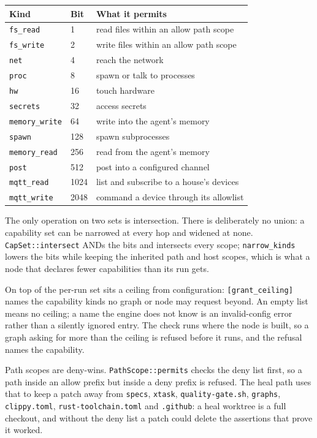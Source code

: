 \begin{longtable}{@{}p{}p{}p{}@{}}
\toprule
\textbf{Kind} & \textbf{Bit} & \textbf{What it permits} \\
\midrule
\endhead
\texttt{fs\_read} & 1 & read files within an allow path scope \\
\texttt{fs\_write} & 2 & write files within an allow path scope \\
\texttt{net} & 4 & reach the network \\
\texttt{proc} & 8 & spawn or talk to processes \\
\texttt{hw} & 16 & touch hardware \\
\texttt{secrets} & 32 & access secrets \\
\texttt{memory\_write} & 64 & write into the agent's memory \\
\texttt{spawn} & 128 & spawn subprocesses \\
\texttt{memory\_read} & 256 & read from the agent's memory \\
\texttt{post} & 512 & post into a configured channel \\
\texttt{mqtt\_read} & 1024 & list and subscribe to a house's devices \\
\texttt{mqtt\_write} & 2048 & command a device through its allowlist \\
\bottomrule
\end{longtable}

The only operation on two sets is intersection. There is deliberately no union: a capability
set can be narrowed at every hop and widened at none. \texttt{CapSet::intersect} ANDs the bits
and intersects every scope; \texttt{narrow\_kinds} lowers the bits while keeping the inherited
path and host scopes, which is what a node that declares fewer capabilities than its run gets.

On top of the per-run set sits a ceiling from configuration: \texttt{[grant\_ceiling]} names
the capability kinds no graph or node may request beyond. An empty list means no ceiling; a
name the engine does not know is an invalid-config error rather than a silently ignored entry.
The check runs where the node is built, so a graph asking for more than the ceiling is refused
before it runs, and the refusal names the capability.

Path scopes are deny-wins. \texttt{PathScope::permits} checks the deny list first, so a path
inside an allow prefix but inside a deny prefix is refused. The heal path uses that to keep a
patch away from \texttt{specs}, \texttt{xtask}, \texttt{quality-gate.sh}, \texttt{graphs},
\texttt{clippy.toml}, \texttt{rust-toolchain.toml} and \texttt{.github}: a heal worktree is a
full checkout, and without the deny list a patch could delete the assertions that prove it
worked.

